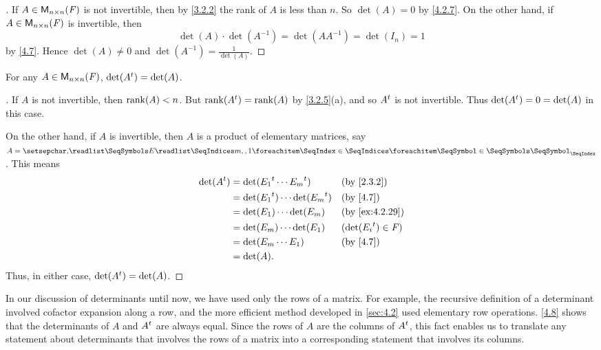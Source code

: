 \begin{proof}[]
	If \(A \in \mathsf{M}_{{n} \times n}({\mathit{F}})\) is not invertible, then by \cref{3.2.2} the rank of \(A\) is less than \(n\).
	So \(\det(A) = 0\) by \cref{4.2.7}.
	On the other hand, if \(A \in \mathsf{M}_{{n} \times n}({\mathit{F}})\) is invertible, then
	\[
		\det(A) \cdot \det(A^{-1}) = \det(A A^{-1}) = \det(I_n) = 1
	\]
	by \cref{4.7}.
	Hence \(\det(A) \neq 0\) and \(\det(A^{-1}) = \frac{1}{\det(A)}\).
\end{proof}

\begin{thm}\label{4.8}
	For any \(A \in \mathsf{M}_{{n} \times n}({\mathit{F}})\), \(\det({A}^{t}) = \det(A)\).
\end{thm}

\begin{proof}[]
	If \(A\) is not invertible, then \(\rk{A} < n\).
	But \(\rk{\tp{A}} = \rk{A}\) by \cref{3.2.5}(a), and so \({A}^{t}\) is not invertible.
	Thus \(\det({A}^{t}) = 0 = \det(A)\) in this case.

	On the other hand, if \(A\) is invertible, then \(A\) is a product of elementary matrices, say \(A = \seq[]{E}{m,,1}\).
	This means
	\begin{align*}
		\det(\tp{A}) & = \det(\tp{E_1} \cdots \tp{E_m})       &  & \by{2.3.2}              \\
		             & = \det(\tp{E_1}) \cdots \det(\tp{E_m}) &  & \by{4.7}                \\
		             & = \det(E_1) \cdots \det(E_m)           &  & \by{ex:4.2.29}          \\
		             & = \det(E_m) \cdots \det(E_1)           &  & (\det(\tp{E_i}) \in \F) \\
		             & = \det(E_m \cdots E_1)                 &  & \by{4.7}                \\
		             & = \det(A).
	\end{align*}
	Thus, in either case, \(\det({A}^{t}) = \det(A)\).
\end{proof}

\begin{note}
	In our discussion of determinants until now, we have used only the rows of a matrix.
	For example, the recursive definition of a determinant involved cofactor expansion along a row, and the more efficient method developed in \cref{sec:4.2} used elementary row operations.
	\cref{4.8} shows that the determinants of \(A\) and \({A}^{t}\) are always equal.
	Since the rows of \(A\) are the columns of \({A}^{t}\), this fact enables us to translate any statement about determinants that involves the rows of a matrix into a corresponding statement that involves its columns.
\end{note}

